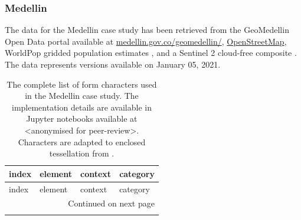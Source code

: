 \subsubsection{Medellin}

The data for the Medellin case study has been retrieved from the GeoMedellin Open Data
 portal available at
 \href{https://www.medellin.gov.co/geomedellin/}{medellin.gov.co/geomedellin/},
 \href{https://osm.org}{OpenStreetMap}, WorldPop gridded population estimates
 \citep{bondarenko2020census}, and a Sentinel 2 cloud-free composite
 \citep{CORBANE2020105737}. The data represents versions available on January 05, 2021.

\begin{longtable}{p{5cm}p{4cm}p{4cm}l}
\caption{The complete list of form characters used in the Medellin case study. The implementation details are available
in Jupyter notebooks available at <anonymised for peer-review>.
Characters are adapted to enclosed tessellation from \cite{fleischmann2021methodological}.}
\label{tab:form_med} \\
\toprule
                                index &                         element &                    context &     category \\
\midrule
\endfirsthead

\toprule
                                index &                         element &                    context &     category \\
\midrule
\endhead
\midrule
\multicolumn{4}{r}{{Continued on next page}} \\
\midrule
\endfoot


\end{longtable}
